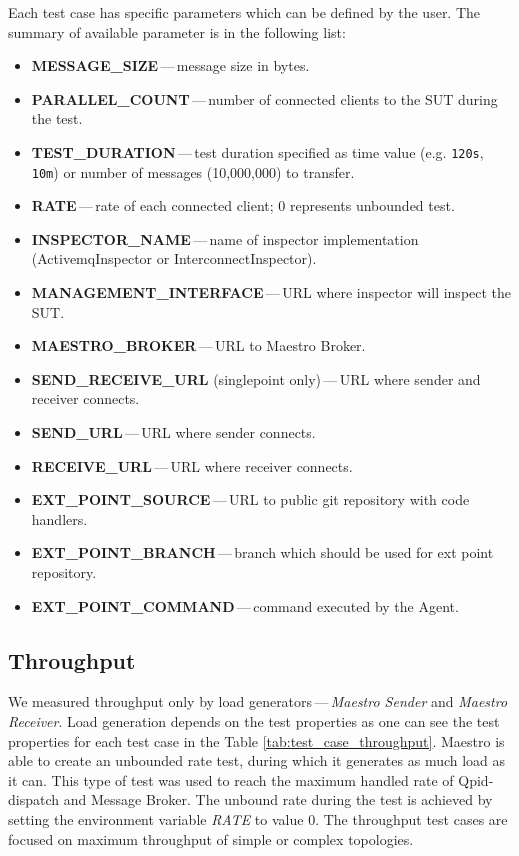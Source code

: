Each test case has specific parameters which can be defined by the user. The summary of available parameter is in the following list:
\begin{itemize}
	\setlength\itemsep{0em}
	\item \textbf{MESSAGE\_SIZE}\,---\,message size in bytes.
	\item \textbf{PARALLEL\_COUNT}\,---\,number of connected clients to the SUT during the test.
	\item \textbf{TEST\_DURATION}\,---\,test duration specified as time value (e.g. \texttt{120s}, \texttt{10m}) or number of messages (10,000,000) to transfer.
	\item \textbf{RATE}\,---\,rate of each connected client; 0 represents unbounded test.
	\item \textbf{INSPECTOR\_NAME}\,---\,name of inspector implementation (ActivemqInspector or InterconnectInspector).
	\item \textbf{MANAGEMENT\_INTERFACE}\,---\,URL where inspector will inspect the SUT.
	\item \textbf{MAESTRO\_BROKER}\,---\,URL to Maestro Broker.
	\item \textbf{SEND\_RECEIVE\_URL} (singlepoint only)\,---\,URL where sender and receiver connects.
	\item \textbf{SEND\_URL}\,---\,URL where sender connects.
	\item \textbf{RECEIVE\_URL}\,---\,URL where receiver connects.
	\item \textbf{EXT\_POINT\_SOURCE}\,---\,URL to public git repository with code handlers.
	\item \textbf{EXT\_POINT\_BRANCH}\,---\,branch which should be used for ext point repository.
	\item \textbf{EXT\_POINT\_COMMAND}\,---\,command executed by the Agent.
\end{itemize}

\subsection{Throughput}
\label{Throughput}
We measured throughput only by load generators\,---\,\emph{Maes\-tro Sender} and \emph{Maestro Receiver}. Load generation depends on the test properties as one can see the test properties for each test case in the Table \ref{tab:test_case_throughput}. Maestro is able to create an unbounded rate test, during which it generates as much load as it can. This type of test was used to reach the maximum handled rate of Qpid-dispatch and Message Broker. The unbound rate during the test is achieved by setting the environment variable \emph{RATE} to value 0. The throughput test cases are focused on maximum throughput of simple or complex topologies.

